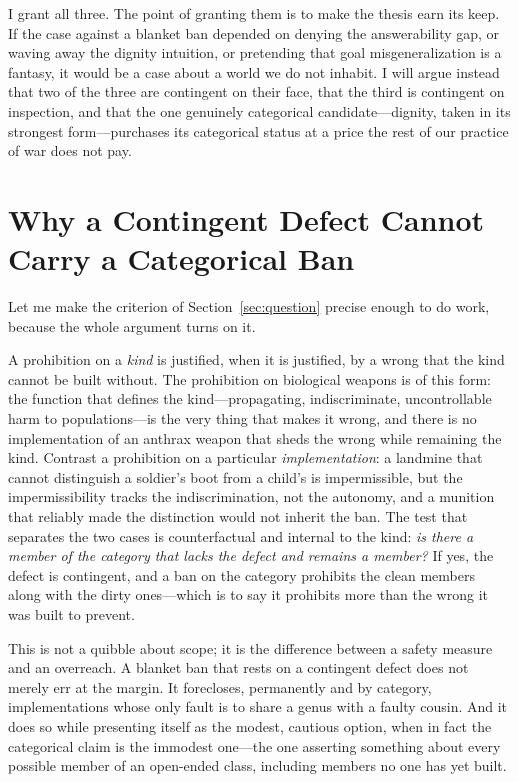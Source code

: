 \documentclass[11pt]{article}
\begin{document}
I grant all three. The point of granting them is to make the thesis earn its keep. If the case against a blanket ban depended on denying the answerability gap, or waving away the dignity intuition, or pretending that goal misgeneralization is a fantasy, it would be a case about a world we do not inhabit. I will argue instead that two of the three are contingent on their face, that the third is contingent on inspection, and that the one genuinely categorical candidate---dignity, taken in its strongest form---purchases its categorical status at a price the rest of our practice of war does not pay.

\section{Why a Contingent Defect Cannot Carry a Categorical Ban}
\label{sec:contingent}

Let me make the criterion of Section~\ref{sec:question} precise enough to do work, because the whole argument turns on it.

A prohibition on a \emph{kind} is justified, when it is justified, by a wrong that the kind cannot be built without. The prohibition on biological weapons is of this form: the function that defines the kind---propagating, indiscriminate, uncontrollable harm to populations---is the very thing that makes it wrong, and there is no implementation of an anthrax weapon that sheds the wrong while remaining the kind. Contrast a prohibition on a particular \emph{implementation}: a landmine that cannot distinguish a soldier's boot from a child's is impermissible, but the impermissibility tracks the indiscrimination, not the autonomy, and a munition that reliably made the distinction would not inherit the ban. The test that separates the two cases is counterfactual and internal to the kind: \emph{is there a member of the category that lacks the defect and remains a member?} If yes, the defect is contingent, and a ban on the category prohibits the clean members along with the dirty ones---which is to say it prohibits more than the wrong it was built to prevent.

This is not a quibble about scope; it is the difference between a safety measure and an overreach. A blanket ban that rests on a contingent defect does not merely err at the margin. It forecloses, permanently and by category, implementations whose only fault is to share a genus with a faulty cousin. And it does so while presenting itself as the modest, cautious option, when in fact the categorical claim is the immodest one---the one asserting something about every possible member of an open-ended class, including members no one has yet built.
\end{document}

